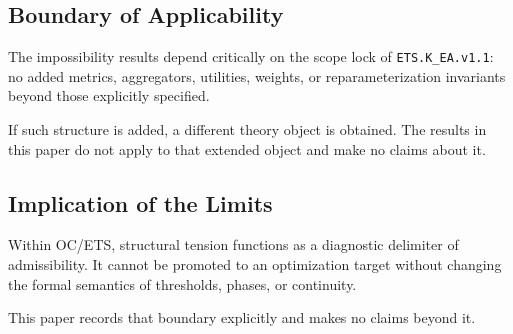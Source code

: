 \subsection{Boundary of Applicability}

The impossibility results depend critically on the scope lock of
\texttt{ETS.K\_EA.v1.1}: no added metrics, aggregators, utilities, weights,
or reparameterization invariants beyond those explicitly specified.

If such structure is added, a different theory object is obtained. The
results in this paper do not apply to that extended object and make no
claims about it.

\subsection{Implication of the Limits}

Within OC/ETS, structural tension functions as a diagnostic delimiter of
admissibility. It cannot be promoted to an optimization target without
changing the formal semantics of thresholds, phases, or continuity.

This paper records that boundary explicitly and makes no claims beyond it.

